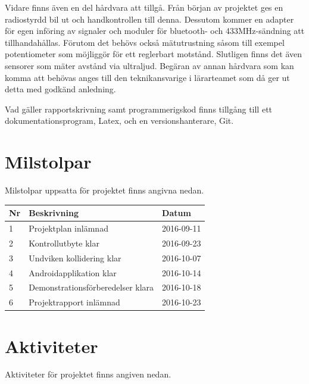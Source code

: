 \documentclass[a4paper]{article}
\begin{document}
Vidare finns även en del hårdvara att tillgå. Från början av projektet ges en radiostyrdd bil ut och handkontrollen till denna. Dessutom kommer en adapter för egen införing av signaler och moduler för bluetooth- och 433MHz-sändning att tillhandahållas. Förutom det behövs också mätutrustning såsom till exempel potentiometer som möjliggör för ett reglerbart motstånd. Slutligen finns det även sensorer som mäter avstånd via ultraljud. Begäran av annan hårdvara som kan komma att behövas anges till den teknikansvarige i lärarteamet som då ger ut detta med godkänd anledning.
 
Vad gäller rapportskrivning samt programmerigskod finns tillgång till ett dokumentationsprogram, Latex, och en versionshanterare, Git. 

\section{Milstolpar}
Milstolpar uppsatta för projektet finns angivna nedan.
\vspace{5mm}

\begin{tabular}{|l|l|l|} \hline
\bf Nr & \bf Beskrivning & \bf Datum \\ \hline \hline
1 & Projektplan inlämnad & 2016-09-11 \\\hline
2 & Kontrollutbyte klar & 2016-09-23 \\ \hline
3 & Undviken kollidering klar & 2016-10-07 \\ \hline
4 & Androidapplikation klar & 2016-10-14 \\ \hline
5 & Demonstrationsförberedelser klara & 2016-10-18 \\ \hline
6 & Projektrapport inlämnad & 2016-10-23 \\ \hline

\end{tabular}

\section{Aktiviteter}
Aktiviteter för projektet finns angiven nedan.
\vspace{5mm}
\end{document}
